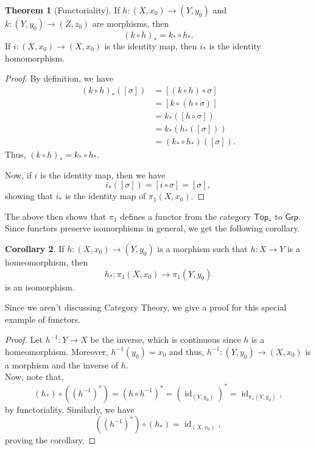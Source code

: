 \documentclass[12pt]{article}
\theoremstyle{definition}
\newtheorem{thm}{Theorem}
\numberwithin{thm}{section}
\newtheorem{cor}[thm]{Corollary}
\newcommand{\id}{\operatorname{id}}
\begin{document}
\begin{thm}[Functoriality]
	If $h:(X, x_0) \to (Y, y_0)$ and $k:(Y, y_0) \to (Z, z_0)$ are morphisms, then
	\begin{equation*} 
		(k \circ h)_* = k_* \circ h_*.
	\end{equation*}
	If $i:(X, x_0) \to (X, x_0)$ is the identity map, then $i_*$ is the identity homomorphism.
\end{thm}
\begin{proof} 
	By definition, we have
	\begin{align*} 
		(k \circ h)_*([\sigma]) &= [(k \circ h) \circ \sigma]\\
		&= [k \circ (h \circ \sigma)]\\
		&= k_*([h\circ \sigma])\\
		&= k_*(h_*([\sigma]))\\
		&= (k_* \circ h_*)([\sigma]).
	\end{align*}
	Thus, $(k \circ h)_* = k_* \circ h_*.$

	Now, if $i$ is the identity map, then we have
	\begin{equation*} 
		i_*([\sigma]) = [i \circ \sigma] = [\sigma],
	\end{equation*}
	showing that $i_*$ is the identity map of $\pi_1(X, x_0).$
\end{proof}
The above then shows that $\pi_1$ defines a functor from the category $\mathsf{Top}_*$ to $\mathsf{Grp}.$\\
Since functors preserve isomorphisms in general, we get the following corollary.
\begin{cor}
	If $h:(X, x_0) \to (Y, y_0)$ is a morphism such that $h:X \to Y$ is a homeomorphism, then
	\begin{equation*} 
		h_* : \pi_1(X, x_0) \to \pi_1(Y, y_0)
	\end{equation*}
	is an isomorphism.
\end{cor}
Since we aren't discussing Category Theory, we give a proof for this special example of functors.
\begin{proof} 
	Let $h^{-1}:Y \to X$ be the inverse, which is continuous since $h$ is a homeomorphism. Moreover, $h^{-1}(y_0) = x_0$ and thus, $h^{-1}:(Y, y_0) \to (X, x_0)$ is a morphism and the inverse of $h.$\\
	Now, note that,
	\begin{equation*} 
		(h_*)\circ((h^{-1})^*) = (h\circ h^{-1})^* = (\id_{(Y, y_0)})^* = \id_{\pi_1(Y, y_0)},
	\end{equation*}
	by functoriality. Similarly, we have
	\begin{equation*} 
		((h^{-1})^*)\circ(h_*) = \id_{(X, x_0)},
	\end{equation*}
	proving the corollary.
\end{proof}
%
%
\end{document}
